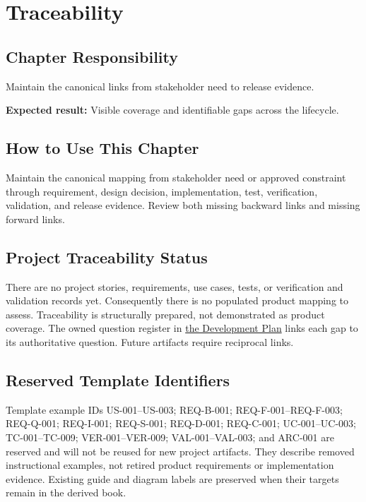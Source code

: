 \chapter{Traceability}
\section{Chapter Responsibility}
\label{Section:TraceabilityResponsibility}
Maintain the canonical links from stakeholder need to release evidence.

\noindent\textbf{Expected result:} Visible coverage and identifiable gaps across the lifecycle.

\section{How to Use This Chapter}
Maintain the canonical mapping from stakeholder need or approved constraint through requirement, design decision, implementation, test, verification, validation, and release evidence. Review both missing backward links and missing forward links.
\section{Project Traceability Status}
\label{Table:TraceabilityMatrix}
There are no project stories, requirements, use cases, tests, or verification
and validation records yet. Consequently there is no populated product mapping
to assess. Traceability is structurally prepared, not demonstrated as product
coverage. The owned question register in
\hyperref[Table:InitializationQuestions]{the Development Plan} links each gap
to its authoritative question. Future artifacts require reciprocal links.

\section{Reserved Template Identifiers}
Template example IDs US-001--US-003; REQ-B-001; REQ-F-001--REQ-F-003;
REQ-Q-001; REQ-I-001; REQ-S-001; REQ-D-001; REQ-C-001; UC-001--UC-003;
TC-001--TC-009; VER-001--VER-009; VAL-001--VAL-003; and ARC-001 are reserved
and will not be reused for new project artifacts. They describe removed
instructional examples, not retired product requirements or implementation
evidence. Existing guide and diagram labels are preserved when their targets
remain in the derived book.
